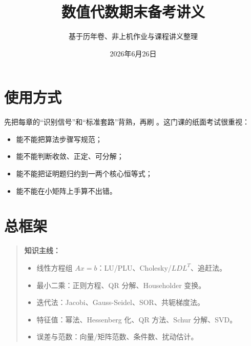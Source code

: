 \documentclass[11pt,a4paper]{ctexart}
\title{\bfseries 数值代数期末备考讲义}
\author{基于历年卷、非上机作业与课程讲义整理}
\date{2026年6月26日}
\newcommand{\code}[1]{\begingroup\ttfamily\small #1\endgroup}
\begin{document}
\maketitle
\tableofcontents
\newpage


\section*{使用方式}


先把每章的“识别信号”和“标准套路”背熟，再刷 \code{}。这门课的纸面考试很重视：

\begin{itemize}

\item 能不能把算法步骤写规范；

\item 能不能判断收敛、正定、可分解；

\item 能不能把证明题归约到一两个核心恒等式；

\item 能不能在小矩阵上手算不出错。

\end{itemize}


\section*{总框架}


\begin{quote}

\textbf{知识主线：}

\begin{itemize}

\item 线性方程组 $Ax=b$：LU/PLU、Cholesky/$LDL^T$、追赶法。

\item 最小二乘：正则方程、QR 分解、Householder 变换。

\item 迭代法：Jacobi、Gauss-Seidel、SOR、共轭梯度法。

\item 特征值：幂法、Hessenberg 化、QR 方法、Schur 分解、SVD。

\item 误差与范数：向量/矩阵范数、条件数、扰动估计。

\end{itemize}

\end{quote}
\end{document}
